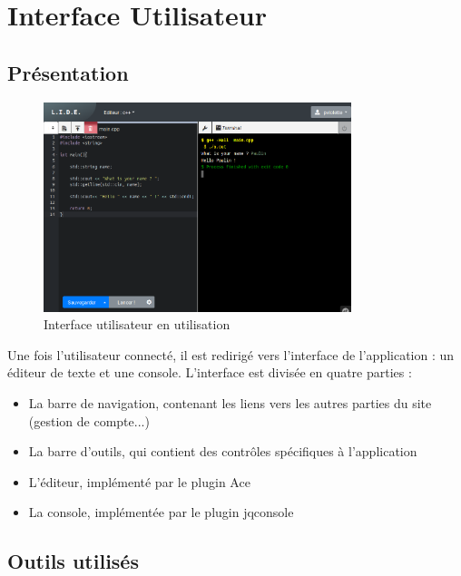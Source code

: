 \chapter{Interface Utilisateur}

\section{Présentation}

\begin{figure}[h]
  \centering
  \includegraphics[width=0.8\textwidth]{./img/frontend/example1.png}
  \caption{Interface utilisateur en utilisation}
  \label{}
\end{figure}

Une fois l'utilisateur connecté, il est redirigé vers l'interface de l'application : un éditeur de texte et une console.
L'interface est divisée en quatre parties :
\begin{itemize}
  \item La barre de navigation, contenant les liens vers les autres parties du site (gestion de compte...)
  \item La barre d'outils, qui contient des contrôles spécifiques à l'application
  \item L'éditeur, implémenté par le plugin Ace
  \item La console, implémentée par le plugin jqconsole
\end{itemize}

\section{Outils utilisés}

